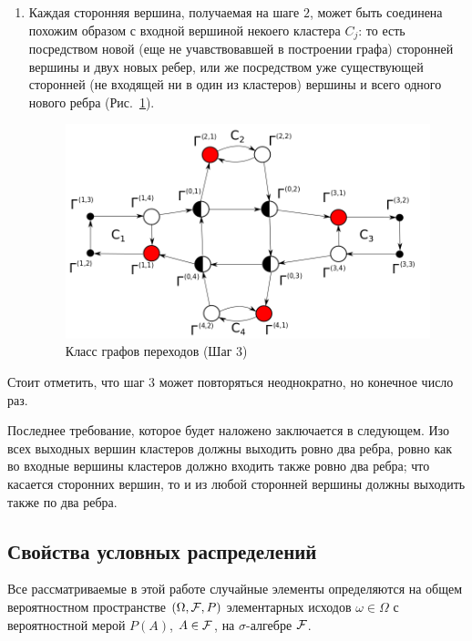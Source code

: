 \documentclass[a4paper,12pt,russian]{extarticle}
\begin{document}
\begin{enumerate}
\item Каждая сторонняя вершина, получаемая на шаге $2$, может быть соединена похожим образом с входной вершиной некоего кластера $C_j$: то есть посредством новой (еще не учавствовавшей в построении графа) сторонней вершины и двух новых ребер, или же посредством уже существующей сторонней (не входящей ни в один из кластеров) вершины и всего одного нового ребра (Рис.~\ref{GraphSchemeTree}).

\begin{figure}[h]
\includegraphics[scale=0.5]{GraphScheme3.png} 
\caption{Класс графов переходов (Шаг 3)}
\label{GraphSchemeTree}
\end{figure}
\end{enumerate}

Стоит отметить, что шаг $3$ может повторяться неоднократно, но конечное число раз.
 
Последнее требование, которое будет наложено заключается в следующем. Изо всех выходных вершин кластеров должны выходить ровно два ребра, ровно как во входные вершины кластеров должно входить также ровно два ребра; что касается сторонних вершин, то и из любой сторонней вершины должны выходить также по два ребра.

\subsection{Свойства условных распределений}

Все рассматриваемые в этой работе случайные элементы определяются на общем вероятностном пространстве $\left(\Omega, {\cal F}, P\right)$ элементарных исходов $\omega \in \Omega$ с вероятностной мерой $P(A)$, $A \in {\cal F}$, на $\sigma$-алгебре ${\cal F}$. 
\end{document}
